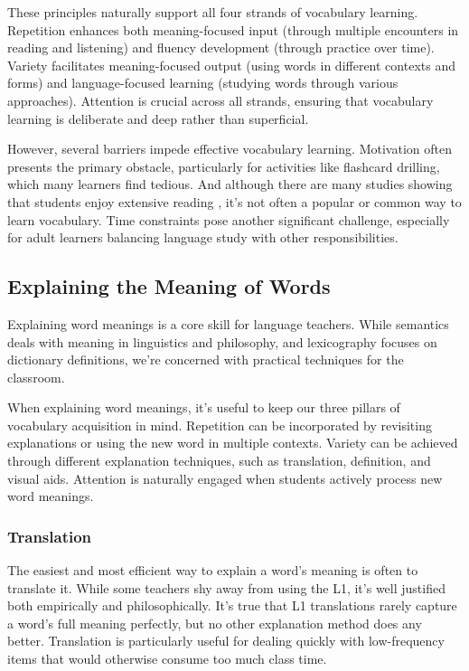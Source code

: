 These principles naturally support all four strands of vocabulary learning. Repetition enhances both meaning-focused input (through multiple encounters in reading and listening) and fluency development (through practice over time). Variety facilitates meaning-focused output (using words in different contexts and forms) and language-focused learning (studying words through various approaches). Attention is crucial across all strands, ensuring that vocabulary learning is deliberate and deep rather than superficial.

However, several barriers impede effective vocabulary learning. Motivation often presents the primary obstacle, particularly for activities like flashcard drilling, which many learners find tedious. And although there are many studies showing that students enjoy extensive reading \citep{Robb2013ER}, it's not often a popular or common way to learn vocabulary. Time constraints pose another significant challenge, especially for adult learners balancing language study with other responsibilities.

\subsection{Explaining the Meaning of Words}\label{sec:explaining-words}

Explaining word meanings is a core skill for language teachers. While semantics deals with meaning in linguistics and philosophy, and lexicography focuses on dictionary definitions, we're concerned with practical techniques for the classroom.

When explaining word meanings, it's useful to keep our three pillars of vocabulary acquisition in mind. Repetition can be incorporated by revisiting explanations or using the new word in multiple contexts. Variety can be achieved through different explanation techniques, such as translation, definition, and visual aids. Attention is naturally engaged when students actively process new word meanings.

\subsubsection{Translation}

The easiest and most efficient way to explain a word's meaning is often to translate it. While some teachers shy away from using the L1, it's well justified both empirically and philosophically. It's true that L1 translations rarely capture a word's full meaning perfectly, but no other explanation method does any better. Translation is particularly useful for dealing quickly with low-frequency items that would otherwise consume too much class time.

